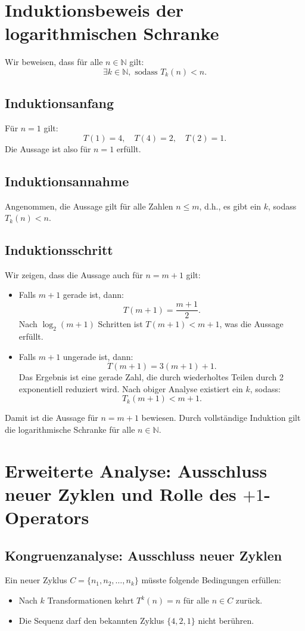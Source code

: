 \documentclass[a4paper,12pt]{article}
\begin{document}
\section{Induktionsbeweis der logarithmischen Schranke}
Wir beweisen, dass für alle \( n \in \mathbb{N} \) gilt:
\[
\exists k \in \mathbb{N}, \text{ sodass } T_k(n) < n.
\]

\subsection{Induktionsanfang}
Für \( n = 1 \) gilt:
\[
T(1) = 4, \quad T(4) = 2, \quad T(2) = 1.
\]
Die Aussage ist also für \( n = 1 \) erfüllt.

\subsection{Induktionsannahme}
Angenommen, die Aussage gilt für alle Zahlen \( n \leq m \), d.h., es gibt ein \( k \), sodass \( T_k(n) < n \).

\subsection{Induktionsschritt}
Wir zeigen, dass die Aussage auch für \( n = m + 1 \) gilt:
\begin{itemize}
    \item Falls \( m + 1 \) gerade ist, dann:
    \[
    T(m + 1) = \frac{m + 1}{2}.
    \]
    Nach \( \log_2(m + 1) \) Schritten ist \( T(m + 1) < m + 1 \), was die Aussage erfüllt.
    \item Falls \( m + 1 \) ungerade ist, dann:
    \[
    T(m + 1) = 3(m + 1) + 1.
    \]
    Das Ergebnis ist eine gerade Zahl, die durch wiederholtes Teilen durch 2 exponentiell reduziert wird. Nach obiger Analyse existiert ein \( k \), sodass:
    \[
    T_k(m + 1) < m + 1.
    \]
\end{itemize}

Damit ist die Aussage für \( n = m + 1 \) bewiesen. Durch vollständige Induktion gilt die logarithmische Schranke für alle \( n \in \mathbb{N} \).

\section{Erweiterte Analyse: Ausschluss neuer Zyklen und Rolle des \(+1\)-Operators}

\subsection{Kongruenzanalyse: Ausschluss neuer Zyklen}
Ein neuer Zyklus \( C = \{n_1, n_2, \dots, n_k\} \) müsste folgende Bedingungen erfüllen:
\begin{itemize}
    \item Nach \( k \) Transformationen kehrt \( T^k(n) = n \) für alle \( n \in C \) zurück.
    \item Die Sequenz darf den bekannten Zyklus \( \{4, 2, 1\} \) nicht berühren.
\end{itemize}
\end{document}
